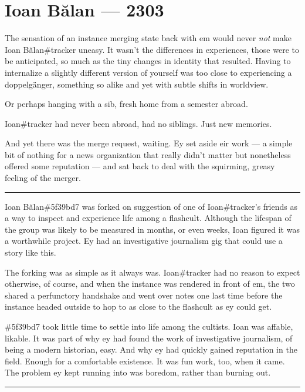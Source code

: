 \chapter*{Ioan Bălan — 2303}

The sensation of an instance merging state back with em would never \emph{not} make Ioan Bălan\#tracker uneasy. It wasn't the differences in experiences, those were to be anticipated, so much as the tiny changes in identity that resulted. Having to internalize a slightly different version of yourself was too close to experiencing a doppelgänger, something so alike and yet with subtle shifts in worldview.

Or perhaps hanging with a sib, fresh home from a semester abroad.

Ioan\#tracker had never been abroad, had no siblings. Just new memories.

And yet there was the merge request, waiting. Ey set aside eir work --- a simple bit of nothing for a news organization that really didn't matter but nonetheless offered some reputation --- and sat back to deal with the squirming, greasy feeling of the merger.

\begin{center}\rule{0.5\linewidth}{0.5pt}\end{center}

Ioan Bălan\#5f39bd7 was forked on suggestion of one of Ioan\#tracker's friends as a way to inspect and experience life among a flashcult. Although the lifespan of the group was likely to be measured in months, or even weeks, Ioan figured it was a worthwhile project. Ey had an investigative journalism gig that could use a story like this.

The forking was as simple as it always was. Ioan\#tracker had no reason to expect otherwise, of course, and when the instance was rendered in front of em, the two shared a perfunctory handshake and went over notes one last time before the instance headed outside to hop to as close to the flashcult as ey could get.

\#5f39bd7 took little time to settle into life among the cultists. Ioan was affable, likable. It was part of why ey had found the work of investigative journalism, of being a modern historian, easy. And why ey had quickly gained reputation in the field. Enough for a comfortable existence. It was fun work, too, when it came. The problem ey kept running into was boredom, rather than burning out.

\begin{center}\rule{0.5\linewidth}{0.5pt}\end{center}

